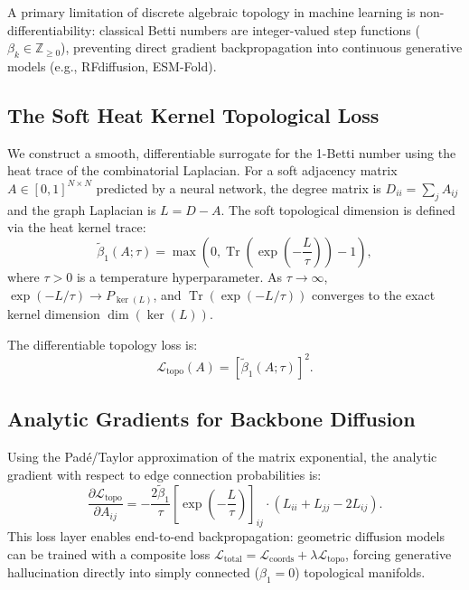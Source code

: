 \documentclass[11pt, a4paper]{article}
\theoremstyle{definition}
\theoremstyle{plain}
\theoremstyle{remark}
\begin{document}
A primary limitation of discrete algebraic topology in machine learning is non-differentiability: classical Betti numbers are integer-valued step functions ($\beta_k \in \mathbb{Z}_{\ge 0}$), preventing direct gradient backpropagation into continuous generative models (e.g., RFdiffusion, ESM-Fold).

\subsection{The Soft Heat Kernel Topological Loss}
We construct a smooth, differentiable surrogate for the 1-Betti number using the heat trace of the combinatorial Laplacian.
For a soft adjacency matrix $A \in [0, 1]^{N \times N}$ predicted by a neural network, the degree matrix is $D_{ii} = \sum_j A_{ij}$ and the graph Laplacian is $L = D - A$.
The soft topological dimension is defined via the heat kernel trace:
\begin{equation}
    \widetilde{\beta}_1(A; \tau) = \max\left(0, \operatorname{Tr}\left(\exp\left(-\frac{L}{\tau}\right)\right) - 1\right),
\end{equation}
where $\tau > 0$ is a temperature hyperparameter. As $\tau \to \infty$, $\exp(-L/\tau) \to P_{\ker(L)}$, and $\operatorname{Tr}(\exp(-L/\tau))$ converges to the exact kernel dimension $\dim(\ker(L))$.

The differentiable topology loss is:
\begin{equation}
    \mathcal{L}_{\text{topo}}(A) = \left[\widetilde{\beta}_1(A; \tau)\right]^2.
\end{equation}

\subsection{Analytic Gradients for Backbone Diffusion}
Using the Padé/Taylor approximation of the matrix exponential, the analytic gradient with respect to edge connection probabilities is:
\begin{equation}
    \frac{\partial \mathcal{L}_{\text{topo}}}{\partial A_{ij}} = -\frac{2 \widetilde{\beta}_1}{\tau} \left[\exp\left(-\frac{L}{\tau}\right)\right]_{ij} \cdot (L_{ii} + L_{jj} - 2 L_{ij}).
\end{equation}
This loss layer enables end-to-end backpropagation: geometric diffusion models can be trained with a composite loss $\mathcal{L}_{\text{total}} = \mathcal{L}_{\text{coords}} + \lambda \mathcal{L}_{\text{topo}}$, forcing generative hallucination directly into simply connected ($\beta_1 = 0$) topological manifolds.
\end{document}
